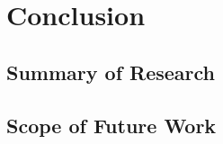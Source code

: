 


\chapter{Conclusion}
 \label{Chapter 5}
 \section{Summary of Research }
 \section{Scope of Future Work}

